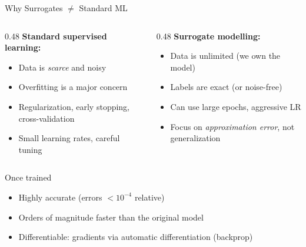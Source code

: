 \documentclass[aspectratio=169,11pt]{beamer}
\newcommand{\emphc}[1]{\textcolor{harvardcrimson}{#1}}
\begin{document}
\begin{frame}{Why Surrogates $\neq$ Standard ML}
\begin{columns}[T]
\begin{column}{0.48\textwidth}
\textbf{Standard supervised learning:}
\begin{itemize}
  \item Data is \emph{scarce} and noisy
  \item Overfitting is a major concern
  \item Regularization, early stopping, cross-validation
  \item Small learning rates, careful tuning
\end{itemize}
\end{column}
\begin{column}{0.48\textwidth}
\textbf{Surrogate modelling:}
\begin{itemize}
  \item Data is \emphc{unlimited} (we own the model)
  \item Labels are \emphc{exact} (or noise-free)
  \item Can use large epochs, aggressive LR
  \item Focus on \emph{approximation error}, not generalization
\end{itemize}
\end{column}
\end{columns}

\vspace{0.5cm}
\begin{block}{Once trained}
\begin{itemize}
  \item \emphc{Highly accurate} (errors $< 10^{-4}$ relative)
  \item \emphc{Orders of magnitude faster} than the original model
  \item \emphc{Differentiable:} gradients via automatic differentiation (backprop)
\end{itemize}
\end{block}
\end{frame}
\end{document}
